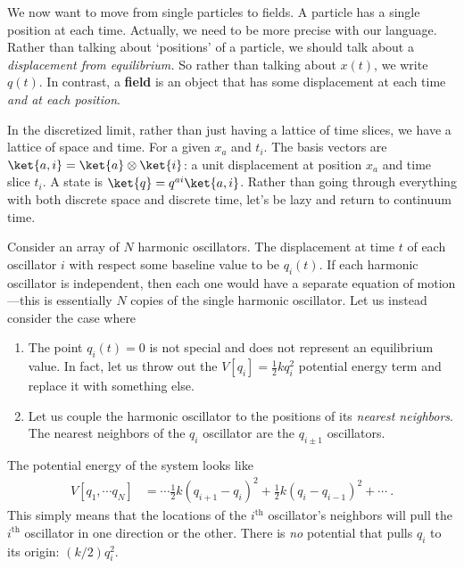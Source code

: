 We now want to move from single particles to fields. 
A particle has a single position at each time. Actually, we need to be more precise with our language. Rather than talking about `positions' of a particle, we should talk about a \emph{displacement from equilibrium.} So rather than talking about $x(t)$, we write $q(t)$. In contrast, a \textbf{field} is an object that has some displacement at each time \emph{and at each position}. 

In the discretized limit, rather than just having a lattice of time slices, we have a lattice of space and time. For a given $x_a$ and $t_i$. The basis vectors are $\ket{a,i} = \ket{a}\otimes \ket{i}$: a unit displacement at position $x_a$ and time slice $t_i$. A state is $\ket{q} = q^{ai}\ket{a,i}$. 
% 
Rather than going through everything with both discrete space and discrete time, let's be lazy and return to continuum time. 

Consider an array of $N$ harmonic oscillators. The displacement at time $t$ of each oscillator $i$ with respect some baseline value to be $q_i(t)$. If each harmonic oscillator is independent, then each one would have a separate equation of motion---this is essentially $N$ copies of the single harmonic oscillator. Let us instead consider the case where
\begin{enumerate}
    \item The point $q_i(t)=0$ is not special and does not represent an equilibrium value. In fact, let us throw out the $V[q_i]=\frac{1}{2}kq_i^2$ potential energy term and replace it with something else.
    \item Let us couple the harmonic oscillator to the positions of its \emph{nearest neighbors}. The nearest neighbors of the $q_i$ oscillator are the $q_{i\pm 1}$ oscillators. 
\end{enumerate}
The potential energy of the system looks like
\begin{align}
    V[q_1,\cdots q_N] &=
    \cdots
    \frac{1}{2}k(q_{i+1}-q_i)^2 +
    \frac{1}{2}k(q_{i}-q_{i-1})^2 +
    \cdots \ .
\end{align}
This simply means that the locations of the $i^\text{th}$ oscillator's neighbors will pull the $i^{\text{th}}$ oscillator in one direction or the other. There is \emph{no} potential that pulls $q_i$ to its origin: $(k/2)q_i^2$. 


